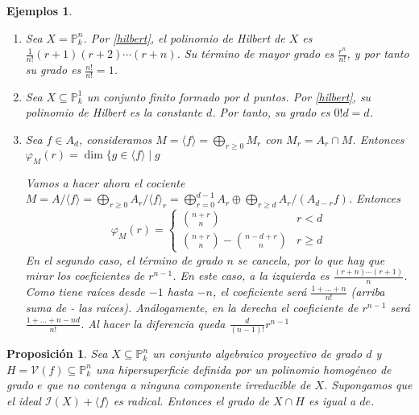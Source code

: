 \documentclass[a4paper,10pt]{book}
\newtheorem{prop}[thm]{Proposición}
\newtheorem{eje}[thm]{Ejemplos}
\newcommand{\PP}{\mathbb P}
\newcommand{\Pnk}{\PP^n_k}
\newcommand{\II}{{\mathcal I}}
\newcommand{\VV}{{\mathcal V}}
\begin{document}
\begin{eje}

\begin{enumerate}
        \item Sea $X=\Pnk$. Por \ref{hilbert}, el polinomio de Hilbert de $X$ es $\frac{1}{n!}(r+1)(r+2)\cdots(r+n)$. Su término de mayor grado es $\frac{r^n}{n!}$, y por tanto su grado es $\frac{n!}{n!}=1$.
\item Sea $X\subseteq\PP^1_k$ un conjunto finito formado por $d$ puntos. Por \ref{hilbert}, su polinomio de Hilbert es la constante $d$. Por tanto, su grado es $0!d=d$.

	\item Sea $f\in A_d$, consideramos $M=\langle f\rangle=\bigoplus_{r\geq 0}M_r$ con $M_r=A_r\cap M$. Entonces $\varphi_M(r)=\dim\{g\in\langle f\rangle\mid g$ %

Vamos a hacer ahora el cociente $M=A/\langle f\rangle=\bigoplus_{r\geq 0} A_r/\langle f\rangle_r=\bigoplus_{r=0}^{d-1}A_r\oplus\bigoplus_{r\geq d}A_r/(A_{d-r}f)$.
Entonces 
\[
\varphi_M(r)=\begin{cases}
\binom{n+r}{n} & r<d\\
\binom{n+r}{n}-\binom{n-d+r}{n} & r\geq d
\end{cases}
\] 
En el segundo caso, el término de grado $n$ se cancela, por lo que hay que mirar los coeficientes de $r^{n-1}$. En este caso, a la izquierda es $\frac{(r+n)\cdots (r+1)}{n}$. Como tiene raíces desde $-1$ hasta $-n$, el coeficiente será $\frac{1+\dots+n}{n!}$ (arriba suma de - las raíces). Análogamente, en la derecha el coeficiente de $r^{n-1}$ será $\frac{1+\dots+n-nd}{n!}$. Al hacer la diferencia queda $\frac{d}{(n-1)!}r^{n-1}$
\end{enumerate}

\end{eje}

\begin{prop}\label{gradointerseccion}
 Sea $X\subseteq\Pnk$ un conjunto algebraico proyectivo de grado $d$ y $H=\VV(f)\subseteq\Pnk$ una hipersuperficie definida por un polinomio homogéneo de grado $e$ que no contenga a ninguna componente irreducible de $X$. Supongamos que el ideal $\II(X)+\langle f\rangle$ es radical. Entonces el grado de $X\cap H$ es igual a $de$.
\end{prop}
\end{document}
